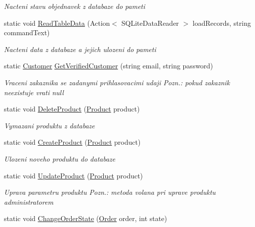 \begin{DoxyCompactItemize}
\begin{DoxyCompactList}\small\item\em Nacteni stavu objednavek z databaze do pameti \end{DoxyCompactList}\item 
static void \mbox{\hyperlink{class_eshop_1_1_database_a9cff1ffe604cabea07eec4b807d0e1c2}{Read\+Table\+Data}} (Action$<$ S\+Q\+Lite\+Data\+Reader $>$ load\+Records, string command\+Text)
\begin{DoxyCompactList}\small\item\em Nacteni data z databaze a jejich ulozeni do pameti \end{DoxyCompactList}\item 
static \mbox{\hyperlink{class_eshop_1_1_customer}{Customer}} \mbox{\hyperlink{class_eshop_1_1_database_a27295cdd902acbf23a5ab9647725f4b8}{Get\+Verified\+Customer}} (string email, string password)
\begin{DoxyCompactList}\small\item\em Vraceni zakaznika se zadanymi prihlasovacimi udaji Pozn.\+: pokud zakaznik neexistuje vrati null \end{DoxyCompactList}\item 
static void \mbox{\hyperlink{class_eshop_1_1_database_af1e45f95550ba58b35c2e3814696193c}{Delete\+Product}} (\mbox{\hyperlink{class_eshop_1_1_product}{Product}} product)
\begin{DoxyCompactList}\small\item\em Vymazani produktu z databaze \end{DoxyCompactList}\item 
static void \mbox{\hyperlink{class_eshop_1_1_database_a9b42824ae9bc2e583a589b031f37f457}{Create\+Product}} (\mbox{\hyperlink{class_eshop_1_1_product}{Product}} product)
\begin{DoxyCompactList}\small\item\em Ulozeni noveho produktu do databaze \end{DoxyCompactList}\item 
static void \mbox{\hyperlink{class_eshop_1_1_database_a2f2575d8ac2a4bb07c782a19497663da}{Update\+Product}} (\mbox{\hyperlink{class_eshop_1_1_product}{Product}} product)
\begin{DoxyCompactList}\small\item\em Uprava parametru produktu Pozn.\+: metoda volana pri uprave produktu administratorem \end{DoxyCompactList}\item 
static void \mbox{\hyperlink{class_eshop_1_1_database_a8df93acf09e8978c520cd83da7393fe7}{Change\+Order\+State}} (\mbox{\hyperlink{class_eshop_1_1_order}{Order}} order, int state)

\end{DoxyCompactItemize}

